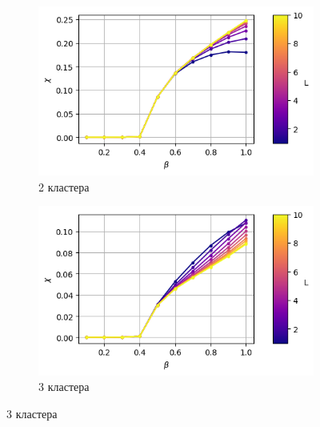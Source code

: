 \documentclass[14pt]{extarticle}
\begin{document}
\begin{figure}[ht]
	\centering
    \begin{subfigure}[t]{0.3\textwidth}
        \includegraphics*[width=\textwidth]{../images/magnetic_susceptibility/clusterized_W20_H50_N2.png}
        \caption*{2 кластера}
    \end{subfigure}
    \begin{subfigure}[t]{0.3\textwidth}
        \includegraphics*[width=\textwidth]{../images/magnetic_susceptibility/clusterized_W20_H50_N3.png}
        \caption*{3 кластера}


\end{subfigure}
\end{figure}
\end{document}
